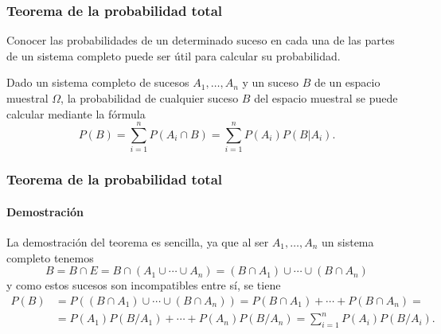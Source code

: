 \begin{frame}
\frametitle{Teorema de la probabilidad total}
Conocer las probabilidades de un determinado suceso en cada una de las partes de un sistema completo puede ser útil para calcular su probabilidad.
\begin{teorema}
Dado un sistema completo de sucesos $A_1,\ldots,A_n$ y un suceso $B$ de un espacio muestral $\Omega$, la probabilidad de cualquier suceso $B$ del espacio muestral se puede calcular mediante la fórmula
\[
	P(B) = \sum_{i=1}^n P(A_i\cap B) = \sum_{i=1}^n P(A_i)P(B|A_i).
\]
\end{teorema}

\end{frame}


\begin{frame}
\frametitle{Teorema de la probabilidad total}
\framesubtitle{Demostración}
La demostración del teorema es sencilla, ya que al ser $A_1,\ldots,A_n$ un sistema completo tenemos
\[
B = B\cap E = B\cap (A_1\cup \cdots \cup A_n) = (B\cap A_1)\cup \cdots \cup (B\cap A_n)
\]
y como estos sucesos son incompatibles entre sí, se tiene
\begin{align*}
P(B) &= P((B\cap A_1)\cup \cdots \cup (B\cap A_n)) = P(B\cap A_1)+\cdots + P(B\cap A_n) =\\
&= P(A_1)P(B/A_1)+\cdots + P(A_n)P(B/A_n) = \sum_{i=1}^n P(A_i)P(B/A_i).
\end{align*}
\end{frame}



